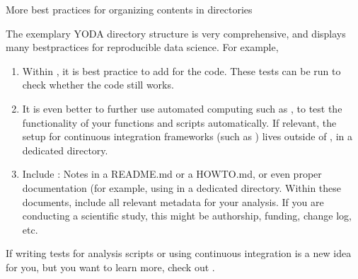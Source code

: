 \ignorespaces \begin{findoutmore}[label={fom-yodaproject}, before title={\thetcbcounter\ }, float, check odd page=true]{More best practices for organizing contents in directories}
\label{\detokenize{basics/101-127-yoda:fom-yodaproject}}

\sphinxAtStartPar
The exemplary YODA directory structure is very comprehensive, and displays many best\sphinxhyphen{}practices for
reproducible data science. For example,
\begin{enumerate}
%
\item {} 
\sphinxAtStartPar
Within , it is best practice to add  for the code.
These tests can be run to check whether the code still works.

\item {} 
\sphinxAtStartPar
It is even better to further use automated computing such as
,
to test the functionality of your functions and scripts automatically.
If relevant, the setup for continuous integration frameworks (such as
) lives outside of ,
in a dedicated  directory.

\item {} 
\sphinxAtStartPar
Include : Notes in a README.md or a HOWTO.md,
or even proper documentation (for example, using  in a dedicated  directory.
Within these documents, include all relevant metadata for your analysis. If you are
conducting a scientific study, this might be authorship, funding,
change log, etc.

\end{enumerate}

\sphinxAtStartPar
If writing tests for analysis scripts or using continuous integration
is a new idea for you, but you want to learn more, check out
.


\end{findoutmore}

